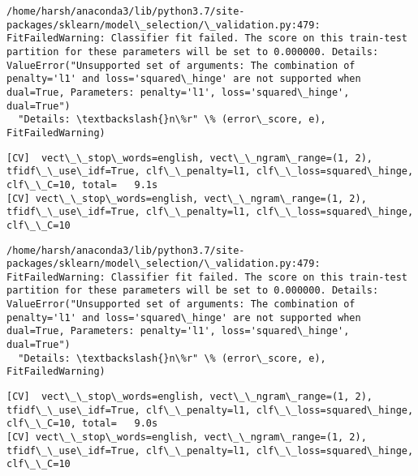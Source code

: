 \documentclass[11pt]{article}
\begin{document}
    \begin{Verbatim}[commandchars=\\\{\}]
/home/harsh/anaconda3/lib/python3.7/site-packages/sklearn/model\_selection/\_validation.py:479: FitFailedWarning: Classifier fit failed. The score on this train-test partition for these parameters will be set to 0.000000. Details: 
ValueError("Unsupported set of arguments: The combination of penalty='l1' and loss='squared\_hinge' are not supported when dual=True, Parameters: penalty='l1', loss='squared\_hinge', dual=True")
  "Details: \textbackslash{}n\%r" \% (error\_score, e), FitFailedWarning)

    \end{Verbatim}

    \begin{Verbatim}[commandchars=\\\{\}]
[CV]  vect\_\_stop\_words=english, vect\_\_ngram\_range=(1, 2), tfidf\_\_use\_idf=True, clf\_\_penalty=l1, clf\_\_loss=squared\_hinge, clf\_\_C=10, total=   9.1s
[CV] vect\_\_stop\_words=english, vect\_\_ngram\_range=(1, 2), tfidf\_\_use\_idf=True, clf\_\_penalty=l1, clf\_\_loss=squared\_hinge, clf\_\_C=10 

    \end{Verbatim}

    \begin{Verbatim}[commandchars=\\\{\}]
/home/harsh/anaconda3/lib/python3.7/site-packages/sklearn/model\_selection/\_validation.py:479: FitFailedWarning: Classifier fit failed. The score on this train-test partition for these parameters will be set to 0.000000. Details: 
ValueError("Unsupported set of arguments: The combination of penalty='l1' and loss='squared\_hinge' are not supported when dual=True, Parameters: penalty='l1', loss='squared\_hinge', dual=True")
  "Details: \textbackslash{}n\%r" \% (error\_score, e), FitFailedWarning)

    \end{Verbatim}

    \begin{Verbatim}[commandchars=\\\{\}]
[CV]  vect\_\_stop\_words=english, vect\_\_ngram\_range=(1, 2), tfidf\_\_use\_idf=True, clf\_\_penalty=l1, clf\_\_loss=squared\_hinge, clf\_\_C=10, total=   9.0s
[CV] vect\_\_stop\_words=english, vect\_\_ngram\_range=(1, 2), tfidf\_\_use\_idf=True, clf\_\_penalty=l1, clf\_\_loss=squared\_hinge, clf\_\_C=10 

    \end{Verbatim}
\end{document}
